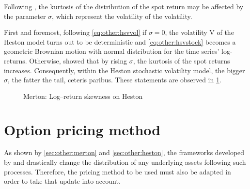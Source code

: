 \documentclass[12pt]{report}
\begin{document}
Following \citet{heston1993}, the kurtosis of the distribution of the spot return may be affected by the parameter $\sigma$, which represent the volatility of the volatility.

First and foremost, following \cref{eq:other:hsvvol} if $\sigma = 0$, the volatility V of the Heston model turns out to be deterministic and \cref{eq:other:hsvstock}  becomes a geometric Brownian motion with normal distribution for the time series' log-returns.
Otherwise, \citet{heston1993} showed that by rising $\sigma$, the kurtosis of the spot returns increases. Consequently, within the Heston stochastic volatility model, the bigger $\sigma$, the fatter the tail, ceteris paribus. These statements are observed in \cref{p:other:heston:kurtosis}.

\begin{figure}[ht]
\centering

\caption{Merton: Log--return skewness on Heston}
\label{p:other:heston:kurtosis}
\end{figure}




\section{Option pricing method}
\label{sec:other:option}

As shown by \cref{sec:other:merton} and \cref{sec:other:heston}, the frameworks developed by \citet{merton76} and \citet{heston1993} drastically change the distribution of any underlying assets following such processes. Therefore, the pricing method to be used must also be adapted in order to take that update into account.
\end{document}
